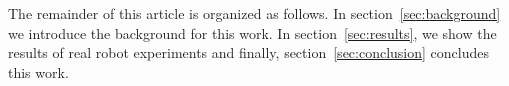 The remainder of this article is organized as follows. In section~\ref{sec:background} we introduce the background for this work. In section~\ref{sec:results}, we show the results of real robot experiments and finally, section~\ref{sec:conclusion} concludes this work.







